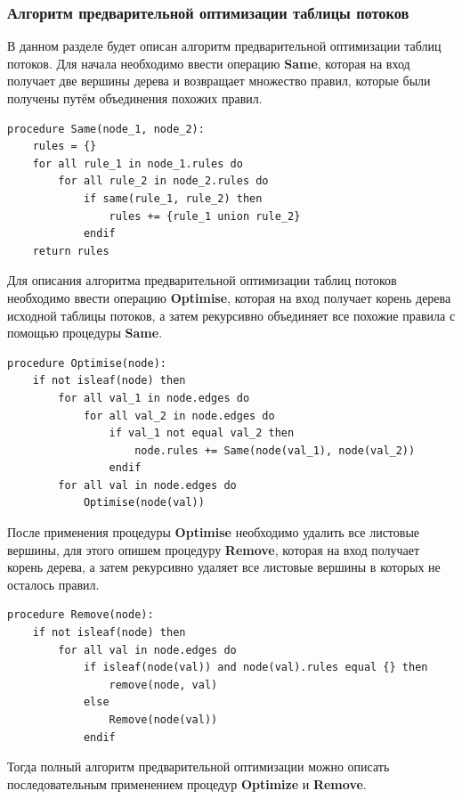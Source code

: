 \documentclass[oneside,final,12pt]{extarticle}
\begin{document}
            \subsubsection{Алгоритм предварительной оптимизации таблицы потоков}
                В данном разделе будет описан алгоритм предварительной оптимизации таблиц потоков. Для начала необходимо ввести
                операцию {\bf Same}, которая на вход получает две вершины дерева и возвращает множество правил, которые были получены путём объединения 
                похожих правил.
\begin{lstlisting}[float=htb]
procedure Same(node_1, node_2):
    rules = {}
    for all rule_1 in node_1.rules do
        for all rule_2 in node_2.rules do
            if same(rule_1, rule_2) then
                rules += {rule_1 union rule_2}
            endif
    return rules
\end{lstlisting}
                Для описания алгоритма предварительной оптимизации таблиц потоков необходимо ввести операцию {\bf Optimise}, которая на вход получает
                корень дерева исходной таблицы потоков, а затем рекурсивно объединяет все похожие правила с помощью процедуры {\bf Same}. 
\begin{lstlisting}[float=htb]
procedure Optimise(node):
    if not isleaf(node) then
        for all val_1 in node.edges do
            for all val_2 in node.edges do
                if val_1 not equal val_2 then
                    node.rules += Same(node(val_1), node(val_2))
                endif
        for all val in node.edges do
            Optimise(node(val))
\end{lstlisting}
                После применения процедуры {\bf Optimise} необходимо удалить все листовые вершины, для этого опишем процедуру {\bf Remove}, которая 
                на вход получает корень дерева, а затем рекурсивно удаляет все листовые вершины в которых не осталось правил.
\begin{lstlisting}[float=htb]
procedure Remove(node):
    if not isleaf(node) then
        for all val in node.edges do
            if isleaf(node(val)) and node(val).rules equal {} then
                remove(node, val)
            else
                Remove(node(val))
            endif
\end{lstlisting}
                Тогда полный алгоритм предварительной оптимизации можно описать последовательным применением процедур {\bf Optimize} и {\bf Remove}.
\end{document}
